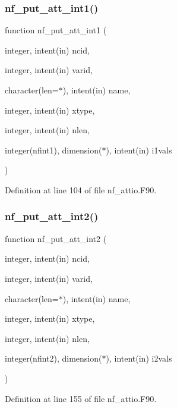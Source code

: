 \subsubsection{\texorpdfstring{nf\+\_\+put\+\_\+att\+\_\+int1()}{nf\_put\_att\_int1()}}
{\footnotesize\ttfamily function nf\+\_\+put\+\_\+att\+\_\+int1 (\begin{DoxyParamCaption}\item[{integer, intent(in)}]{ncid,  }\item[{integer, intent(in)}]{varid,  }\item[{character(len=$\ast$), intent(in)}]{name,  }\item[{integer, intent(in)}]{xtype,  }\item[{integer, intent(in)}]{nlen,  }\item[{integer(nfint1), dimension($\ast$), intent(in)}]{i1vals }\end{DoxyParamCaption})}



Definition at line 104 of file nf\+\_\+attio.\+F90.

\mbox{\label{nf__attio_8F90_a8914ddb3595b3a3c507a0b1374408b4c}} 
\subsubsection{\texorpdfstring{nf\+\_\+put\+\_\+att\+\_\+int2()}{nf\_put\_att\_int2()}}
{\footnotesize\ttfamily function nf\+\_\+put\+\_\+att\+\_\+int2 (\begin{DoxyParamCaption}\item[{integer, intent(in)}]{ncid,  }\item[{integer, intent(in)}]{varid,  }\item[{character(len=$\ast$), intent(in)}]{name,  }\item[{integer, intent(in)}]{xtype,  }\item[{integer, intent(in)}]{nlen,  }\item[{integer(nfint2), dimension($\ast$), intent(in)}]{i2vals }\end{DoxyParamCaption})}



Definition at line 155 of file nf\+\_\+attio.\+F90.

